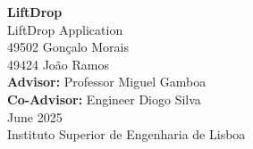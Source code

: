 \documentclass[a4paper,twoside,11pt]{article}
\begin{document}
\begin{titlepage}
    \thispagestyle{empty}
    \centering
    \vspace*{2cm}

    \Huge\textbf{LiftDrop} \\
    \Large LiftDrop Application \\[2cm]

    \Large
    49502 Gonçalo Morais \\[0.5cm]
    49424 João Ramos \\[1.5cm]

    \Large\textbf{Advisor:} Professor Miguel Gamboa \\
    \Large\textbf{Co-Advisor:} Engineer Diogo Silva \\[2cm]

    \Large June 2025 \\[2cm]

    \vfill
    \Large Instituto Superior de Engenharia de Lisboa
\end{titlepage}

\newpage
\thispagestyle{empty}
\null
\newpage




\newpage
\thispagestyle{empty}
\null
\newpage

\tableofcontents
\newpage
\listoffigures
\newpage
\lstlistoflistings
\newpage


\newpage

\newpage
\thispagestyle{empty}
\null
\newpage

\setcounter{page}{1}



\newpage










\end{document}
